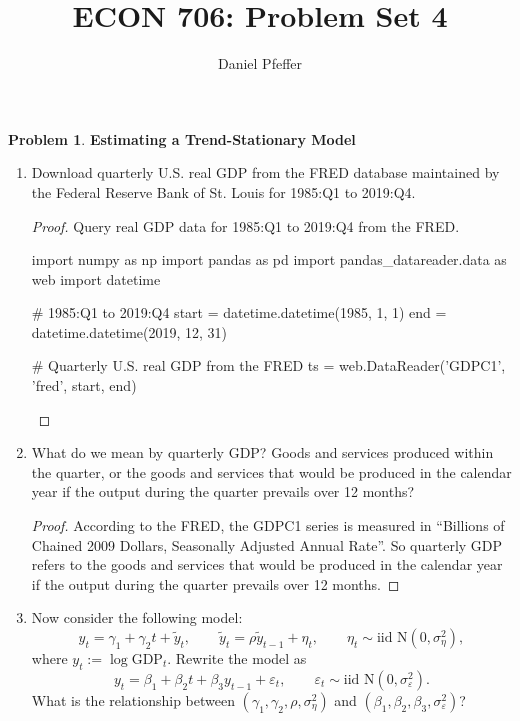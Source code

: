 \documentclass[oneside,reqno]{amsart}
\title{ECON 706: Problem Set 4}
\author{Daniel Pfeffer}
\newcommand{\eps}{\varepsilon}
\theoremstyle{definition}
\newtheorem{prob}{Problem}
\begin{document}
\maketitle

\begin{prob}\label{prob1}
\textbf{Estimating a Trend-Stationary Model}
\end{prob}

\begin{enumerate}
\item
Download quarterly U.S. real GDP from the FRED database maintained by the Federal Reserve Bank of St. Louis for 1985:Q1 to 2019:Q4.

\begin{proof}
Query real GDP data for 1985:Q1 to 2019:Q4 from the FRED. 
\begin{python3code}
import numpy as np
import pandas as pd
import pandas_datareader.data as web
import datetime

# 1985:Q1 to 2019:Q4
start = datetime.datetime(1985, 1, 1)
end = datetime.datetime(2019, 12, 31)

# Quarterly U.S. real GDP from the FRED
ts = web.DataReader('GDPC1', 'fred', start, end)
\end{python3code}
\end{proof}

\item
What do we mean by quarterly GDP? Goods and services produced within the quarter, or the goods and services that would be produced in the calendar year if the output during the quarter prevails over 12 months?

\begin{proof}
According to the FRED, the GDPC1 series is measured in ``Billions of Chained 2009 Dollars, Seasonally Adjusted Annual Rate''. So quarterly GDP refers to the goods and services that would be produced in the calendar year if the output during the quarter prevails over 12 months.
\end{proof}


\item
Now consider the following model:
\begin{equation}\label{eq:1}
	y_t = \gamma_1  + \gamma_2 t + \tilde y_t, 
	\qquad 
	\tilde y_t = \rho  \tilde y_{t-1} + \eta_t,
	\qquad 
	\eta_t \sim \text{iid N} (0, \sigma_\eta^2),
\end{equation}
where $y_t := \log \text{GDP}_t$. Rewrite the model as 
\begin{equation}\label{eq:2}
	y_t = \beta_1 + \beta_2 t + \beta_3 y_{t-1} + \eps_t,
	\qquad 
	\eps_t \sim \text{iid N}(0, \sigma_\eps^2).
\end{equation}
What is the relationship between $(\gamma_1, \gamma_2, \rho, \sigma_\eta^2)$ and $(\beta_1, \beta_2, \beta_3, \sigma_\eps^2)$?


\end{enumerate}
\end{document}
